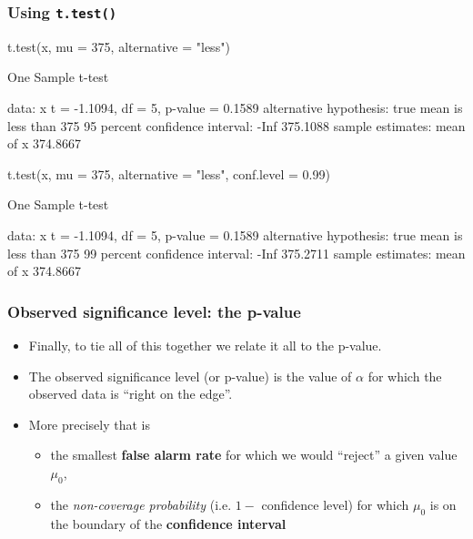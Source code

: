 \documentclass[a4paper]{article}\usepackage[]{graphicx}\usepackage[]{xcolor}
\begin{document}
\subsubsection{Using \lstinline|t.test()|}
\begin{Schunk}
\begin{Sinput}
t.test(x, mu = 375, alternative = "less")
\end{Sinput}
\begin{Soutput}

	One Sample t-test

data:  x
t = -1.1094, df = 5, p-value = 0.1589
alternative hypothesis: true mean is less than 375
95 percent confidence interval:
     -Inf 375.1088
sample estimates:
mean of x 
 374.8667 
\end{Soutput}
\begin{Sinput}
t.test(x, mu = 375, alternative = "less", conf.level = 0.99)
\end{Sinput}
\begin{Soutput}

	One Sample t-test

data:  x
t = -1.1094, df = 5, p-value = 0.1589
alternative hypothesis: true mean is less than 375
99 percent confidence interval:
     -Inf 375.2711
sample estimates:
mean of x 
 374.8667 
\end{Soutput}
\end{Schunk}
\subsubsection{Observed significance level: the p-value}
\begin{itemize}
	\item Finally, to tie all of this together we relate it all to the p-value.
	\item The observed significance level (or p-value) is the value of \( \alpha \) for which the observed data is ``right on the edge''.
	\item More precisely that is
	\begin{itemize}
		\item the smallest \textcolor{mygreen}{\textbf{false alarm rate}} for which we would ``reject'' a given value \( \mu_0 \),
		\item the \textit{non-coverage probability} (i.e. \( 1 - \) confidence level) for which \( \mu_0 \) is on the boundary of the \textcolor{myred}{\textbf{confidence interval}}
	\end{itemize}
\end{itemize}
\end{document}
